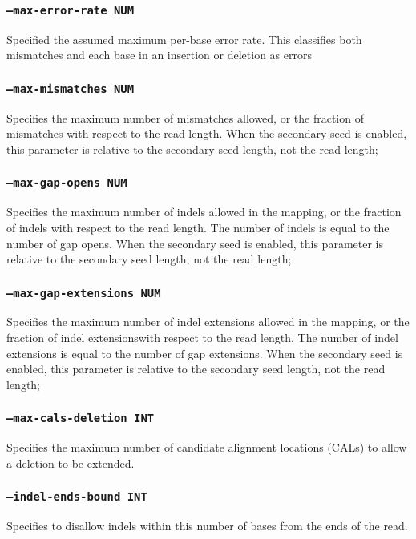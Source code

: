 \documentclass[a4paper,12pt]{book}
\newcommand{\TT}[1]{{\tt #1}} %
\begin{document}
\subsubsection{\TT{--max-error-rate NUM}}
Specified the assumed maximum per-base error rate.
This classifies both mismatches and each base in an insertion or deletion as errors 

\subsubsection{\TT{--max-mismatches NUM}}
Specifies the maximum number of mismatches allowed, or the fraction of mismatches with respect to the read length.
When the secondary seed is enabled, this parameter is relative to the secondary seed length, not the read length;

\subsubsection{\TT{--max-gap-opens NUM}}
Specifies the maximum number of indels allowed in the mapping, or the fraction of indels with respect to the read length.
The number of indels is equal to the number of gap opens.
When the secondary seed is enabled, this parameter is relative to the secondary seed length, not the read length;

\subsubsection{\TT{--max-gap-extensions NUM}}
Specifies the maximum number of indel extensions allowed in the mapping, or the fraction of indel extensionswith respect to the read length.
The number of indel extensions is equal to the number of gap extensions.
When the secondary seed is enabled, this parameter is relative to the secondary seed length, not the read length;

\subsubsection{\TT{--max-cals-deletion INT}}
Specifies the maximum number of candidate alignment locations (CALs) to allow a deletion to be extended.

\subsubsection{\TT{--indel-ends-bound INT}}
Specifies to disallow indels within this number of bases from the ends of the read.
\end{document}
